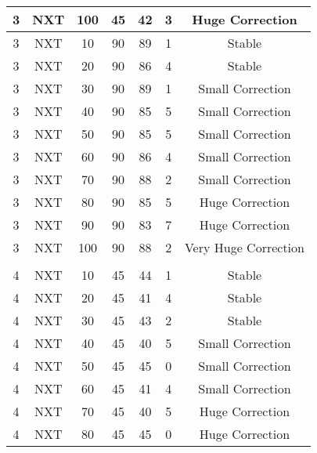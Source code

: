 \begin{longtable}[c]{|ccccccc|}
3  & NXT  & 100    & 45    & 42                & 3          & Huge Correction         \\\hline
3  & NXT  & 10     & 90    & 89                & 1          & Stable                  \\\hline
3  & NXT  & 20     & 90    & 86                & 4          & Stable                  \\\hline
3  & NXT  & 30     & 90    & 89                & 1          & Small Correction        \\\hline
3  & NXT  & 40     & 90    & 85                & 5          & Small Correction        \\\hline
3  & NXT  & 50     & 90    & 85                & 5          & Small Correction        \\\hline
3  & NXT  & 60     & 90    & 86                & 4          & Small Correction        \\\hline
3  & NXT  & 70     & 90    & 88                & 2          & Small Correction        \\\hline
3  & NXT  & 80     & 90    & 85                & 5          & Huge Correction         \\\hline
3  & NXT  & 90     & 90    & 83                & 7          & Huge Correction         \\\hline
3  & NXT  & 100    & 90    & 88                & 2          & Very Huge Correction    \\\hline
   &      &        &       &                   &            &                         \\\hline
4  & NXT  & 10     & 45    & 44                & 1          & Stable                  \\\hline
4  & NXT  & 20     & 45    & 41                & 4          & Stable                  \\\hline
4  & NXT  & 30     & 45    & 43                & 2          & Stable                  \\\hline
4  & NXT  & 40     & 45    & 40                & 5          & Small Correction        \\\hline
4  & NXT  & 50     & 45    & 45                & 0          & Small Correction        \\\hline
4  & NXT  & 60     & 45    & 41                & 4          & Small Correction        \\\hline
4  & NXT  & 70     & 45    & 40                & 5          & Huge Correction         \\\hline
4  & NXT  & 80     & 45    & 45                & 0          & Huge Correction         \\\hline

\end{longtable}
